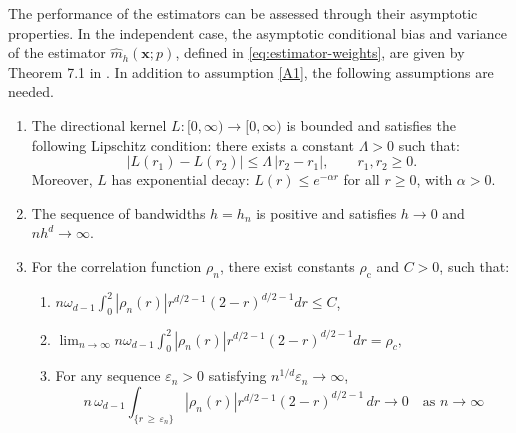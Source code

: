 \documentclass[12pt]{report} %
\newcommand{\bx}{\mathbf{x}}
\newcommand{\by}{\mathbf{y}}
\newcommand{\bu}{\boldsymbol{u}}
\newcommand{\om}[1]{\omega_{#1}}
\begin{document}
The performance of the estimators can be assessed through their asymptotic properties. In the independent case, the asymptotic conditional bias and variance of the estimator $\hat{m}_{h}(\bx;p)$, defined in \eqref{eq:estimator-weights}, are given by Theorem 7.1 in \citet{Garcia-Portugues2014a}. In addition to assumption \ref{A1}, the following assumptions are needed. 
\begin{enumerate}[label=\textbf{(A\arabic*)}, ref=\textbf{(A\arabic*)}, start=2]


    \item \label{A2} The directional kernel $L : [0, \infty) \to [0, \infty)$ is bounded and satisfies the following Lipschitz condition: there exists a constant $\Lambda > 0$ such that:
    $$
    \left|L\!\left(r_1\right) - L\!\left(r_2\right)\right| \leq \Lambda\,|r_2 - r_1|, \quad \quad r_1, r_2 \geq 0.
    $$
    Moreover, $L$ has exponential decay: $L(r) \leq e^{-\alpha r}$ for all $r \geq 0$, with $\alpha > 0$.

    \item \label{A3}  The sequence of bandwidths $h = h_n$ is positive and satisfies $h \to 0$ and $nh^d \to \infty$.


    \item \label{A4} For the correlation function $\rho_n$, there exist constants $\rho_{\mathrm{c}}$ and $C > 0$, such that:

    \begin{enumerate}[label=(\roman*)]
        \item $\displaystyle n \om{d-1} \int_{0}^{2} \left|\rho_n(r)\right|r^{d/2-1} (2-r)^{d/2-1} dr \leq C$,
        
        \item $\lim_{n \to \infty} n \om{d-1} \int_{0}^{2} \left|\rho_n(r)\right|r^{d/2-1} (2-r)^{d/2-1} dr = \rho_c,$
        
        \item For any sequence $\varepsilon_n > 0$ satisfying $n^{1/d} \varepsilon_n \to \infty$,
        $$
         n\,\omega_{d-1} \int_{\{r\,\geq\,\varepsilon_n\}} \left|\rho_n(r)\right| r^{d/2-1}(2-r)^{d/2-1}\,dr \longrightarrow 0 \quad \text{as } n\to\infty
        $$
    \end{enumerate}
    

\end{enumerate}
\end{document}
